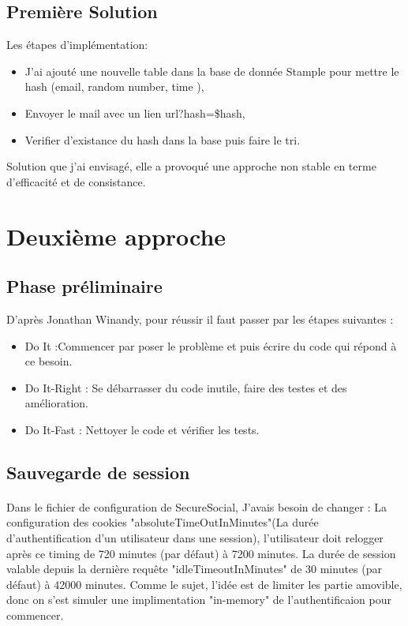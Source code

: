 \subsection{Première Solution}
Les étapes d'implémentation: 
\begin{itemize}
\item J'ai ajouté une nouvelle table dans la base de donnée Stample pour mettre le hash (email, random number, time ),
\item Envoyer le mail avec un lien url?hash=\$hash,
\item Verifier d'existance du hash dans la base puis faire le tri.

\end{itemize}
Solution que j'ai envisagé, elle a provoqué une approche non stable en terme d'efficacité et de consistance.
\section{Deuxième approche}
\subsection{Phase préliminaire}
D'après Jonathan Winandy, pour réussir il faut passer par les étapes suivantes :
\begin{itemize}

\item Do It :Commencer par poser le problème et puis écrire du code qui répond à ce besoin.  
\item Do It-Right : Se débarrasser du code inutile, faire des testes et des amélioration.
\item Do It-Fast : Nettoyer le code et vérifier les tests.
\end{itemize}

\subsection{Sauvegarde de session}
\paragraph{}
Dans le fichier de configuration de SecureSocial, J'avais besoin de changer : La configuration des cookies "absoluteTimeOutInMinutes"(La durée d'authentification d'un utilisateur dans une session), l'utilisateur doit relogger après ce timing de 720 minutes (par défaut) à 7200 minutes.
La durée de session valable depuis la dernière requête  "idleTimeoutInMinutes" de 30 minutes (par défaut) à 42000 minutes.
Comme le sujet, l'idée est de limiter les partie amovible, donc on s'est simuler une implimentation "in-memory" de l'authentificaion pour commencer.
